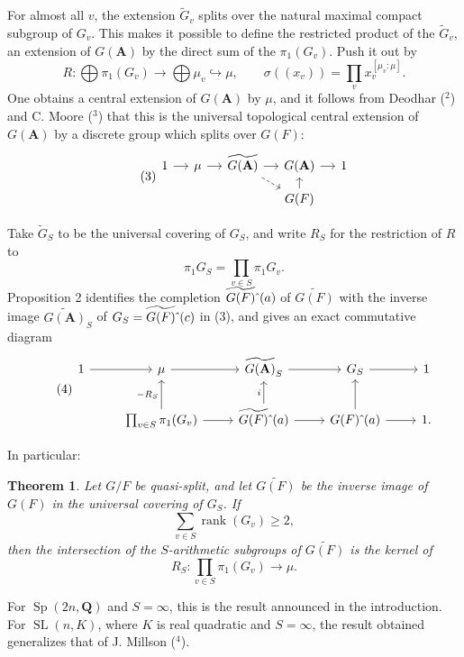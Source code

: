 \documentclass[10pt]{amsart}
\theoremstyle{plain}
\newtheorem{theorem}{Theorem}
\theoremstyle{definition}
\DeclareMathOperator{\rank}{rank}
\DeclareMathOperator{\Sp}{Sp}
\DeclareMathOperator{\SL}{SL}
\begin{document}
For almost all $v$, the extension $\widetilde G_v$ splits over the natural maximal compact subgroup of $G_v$. This makes it possible to define the restricted product of the $\widetilde G_v$, an extension of $G(\mathbf A)$ by the direct sum of the $\pi_1(G_v)$. Push it out by
\[
R:\bigoplus\pi_1(G_v)\to\bigoplus\mu_v\hookrightarrow\mu,
\qquad
\sigma((x_v))=\prod_v x_v^{[\mu_v:\mu]}.
\]
One obtains a central extension of $G(\mathbf A)$ by $\mu$, and it follows from Deodhar ($^2$) and C. Moore ($^3$) that this is the universal topological central extension of $G(\mathbf A)$ by a discrete group which splits over $G(F)$:
\begin{equation}\tag{3}
\begin{tikzcd}[column sep=small, row sep=small]
1 \arrow[r] & \mu \arrow[r] & \widetilde{G(\mathbf A)} \arrow[r] \arrow[dr, dashrightarrow] & G(\mathbf A) \arrow[r] & 1 \\
& & & G(F) \arrow[u] &
\end{tikzcd}
\end{equation}

Take $\widetilde G_S$ to be the universal covering of $G_S$, and write $R_S$ for the restriction of $R$ to
\[
\pi_1G_S=\prod_{v\in S}\pi_1G_v.
\]
Proposition 2 identifies the completion $\widetilde{G(F)}\hat{\mkern6mu}(a)$ of $\widetilde{G(F)}$ with the inverse image $\widetilde{G(\mathbf A)}_S$ of $G_S=\widetilde{G(F)}\hat{\mkern6mu}(c)$ in (3), and gives an exact commutative diagram
\begin{equation}\tag{4}
\begin{tikzcd}
1 \arrow[r] & \mu \arrow[r] & \widetilde{G(\mathbf A)}_S \arrow[r] & G_S \arrow[r] & 1 \\
& \prod_{v\in S}\pi_1(G_v) \arrow[u,"-R_S"] \arrow[r] & \widetilde{G(F)}\hat{\mkern6mu}(a) \arrow[u,"i"] \arrow[r] & G(F)\hat{\mkern6mu}(a) \arrow[u] \arrow[r] & 1.
\end{tikzcd}
\end{equation}

In particular:
\begin{theorem}
Let $G/F$ be quasi-split, and let $\widetilde{G(F)}$ be the inverse image of $G(F)$ in the universal covering of $G_S$. If
\[
\sum_{v\in S}\rank(G_v)\ge2,
\]
then the intersection of the $S$-arithmetic subgroups of $\widetilde{G(F)}$ is the kernel of
\[
R_S:\prod_{v\in S}\pi_1(G_v)\to\mu.
\]
\end{theorem}

For $\Sp(2n,\mathbf Q)$ and $S=\infty$, this is the result announced in the introduction. For $\SL(n,K)$, where $K$ is real quadratic and $S=\infty$, the result obtained generalizes that of J. Millson ($^4$).
\end{document}
